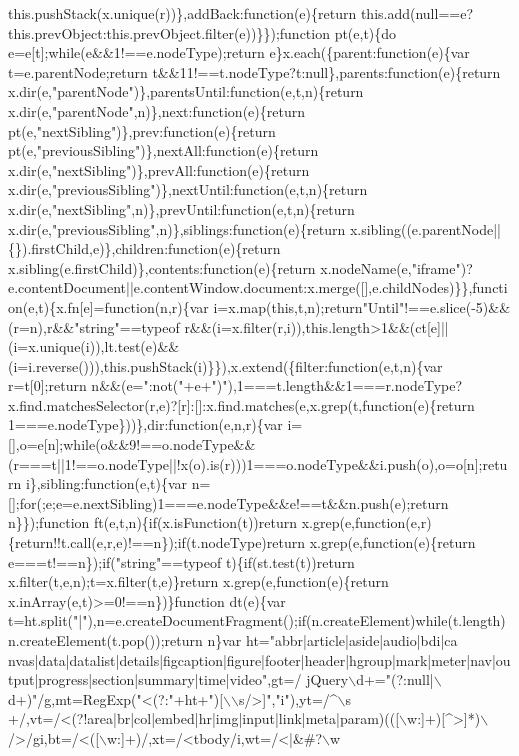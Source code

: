 \begin{DoxyCode}
{       this.pushStack(x.unique(r))\},addBack:function(e)\{return
       this.add(null==e?this.prevObject:this.prevObject.filter(e))\}\});function pt(e,t)\{do e=e[t];while(e&&1!==e.nodeType);return e\}x.each(\{parent:function(e)\{var
       t=e.parentNode;return t&&11!==t.nodeType?t:null\},parents:function(e)\{return
       x.dir(e,"parentNode")\},parentsUntil:function(e,t,n)\{return x.dir(e,"parentNode",n)\},next:function(e)\{return pt(e,"nextSibling")\},prev:function(e)\{return
       pt(e,"previousSibling")\},nextAll:function(e)\{return x.dir(e,"nextSibling")\},prevAll:function(e)\{return
       x.dir(e,"previousSibling")\},nextUntil:function(e,t,n)\{return
       x.dir(e,"nextSibling",n)\},prevUntil:function(e,t,n)\{return x.dir(e,"previousSibling",n)\},siblings:function(e)\{return
       x.sibling((e.parentNode||\{\}).firstChild,e)\},children:function(e)\{return x.sibling(e.firstChild)\},contents:function(e)\{return
       x.nodeName(e,"iframe")?e.contentDocument||e.contentWindow.document:x.merge([],e.childNodes)\}\},function(e,t)\{x.fn[e]=function(n,r)\{var
       i=x.map(this,t,n);return"Until"!==e.slice(-5)&&(r=n),r&&"string"==typeof
       r&&(i=x.filter(r,i)),this.length>1&&(ct[e]||(i=x.unique(i)),lt.test(e)&&(i=i.reverse())),this.pushStack(i)\}\}),x.extend(\{filter:function(e,t,n)\{var
       r=t[0];return
       n&&(e=":not("+e+")"),1===t.length&&1===r.nodeType?x.find.matchesSelector(r,e)?[r]:[]:x.find.matches(e,x.grep(t,function(e)\{return 1===e.nodeType\}))\},dir:function(e,n,r)\{var
       i=[],o=e[n];while(o&&9!==o.nodeType&&(r===t||1!==o.nodeType||!x(o).is(r)))1===o.nodeType&&i.push(o),o=o[n];return
       i\},sibling:function(e,t)\{var n=[];for(;e;e=e.nextSibling)1===e.nodeType&&e!==t&&n.push(e);return n\}\});function
       ft(e,t,n)\{if(x.isFunction(t))return x.grep(e,function(e,r)\{return!!t.call(e,r,e)!==n\});if(t.nodeType)return
       x.grep(e,function(e)\{return e===t!==n\});if("string"==typeof t)\{if(st.test(t))return x.filter(t,e,n);t=x.filter(t,e)\}return
       x.grep(e,function(e)\{return x.inArray(e,t)>=0!==n\})\}function dt(e)\{var
       t=ht.split("|"),n=e.createDocumentFragment();if(n.createElement)while(t.length)n.createElement(t.pop());return n\}var
       ht="abbr|article|aside|audio|bdi|ca
      nvas|data|datalist|details|figcaption|figure|footer|header|hgroup|mark|meter|nav|output|progress|section|summary|time|video",gt=/ jQuery\(\backslash\)d+="(?:null|\(\backslash\)d+)"/g,mt=RegExp("<(?:"+ht+")[\(\backslash\)\(\backslash\)s/>]","i"),yt=/^\(\backslash\)s
      +/,vt=/<(?!area|br|col|embed|hr|img|input|link|meta|param)(([\(\backslash\)w:]+)[^>]*)\(\backslash\)/>/gi,bt=/<([\(\backslash\)w:]+)/,xt=/<tbody/i,wt=/<|&#?\(\backslash\)w
}
\end{DoxyCode}
